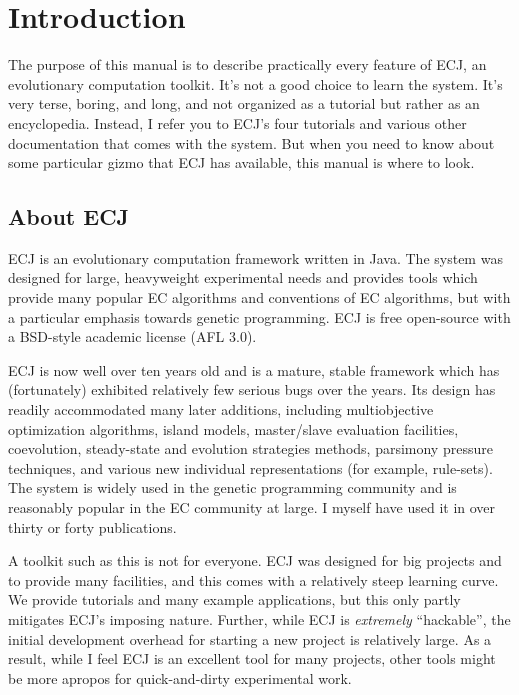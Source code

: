 \documentclass[twoside,10pt]{book}
\begin{document}
\normalsize
\cleardoublepage

\tableofcontents
\clearpage


\chapter{Introduction}

The purpose of this manual is to describe practically every feature of ECJ, an evolutionary computation toolkit.  It's not a good choice to learn the system.  It's very terse, boring, and long, and not organized as a tutorial but rather as an encyclopedia.  Instead, I refer you to ECJ's four tutorials and various other documentation that comes with the system.  But when you need to know about some particular gizmo that ECJ has available, this manual is where to look.

\section{About ECJ}

ECJ is an evolutionary computation framework written in Java.  The system was designed for large, heavyweight experimental needs and provides tools which provide many popular EC algorithms and conventions of EC algorithms, but with a particular emphasis towards genetic programming. ECJ is free open-source with a BSD-style academic license (AFL 3.0).

ECJ is now well over ten years old and is a mature, stable framework which has (fortunately) exhibited relatively few serious bugs over the years.  Its design has readily accommodated many later additions, including multiobjective optimization algorithms, island models, master/slave evaluation facilities, coevolution, steady-state and evolution strategies methods, parsimony pressure techniques, and various new individual representations (for example, rule-sets). The system is widely used in the genetic programming community and is reasonably popular in the EC community at large. I myself have used it in over thirty or forty publications.

A toolkit such as this is not for everyone.  ECJ was designed for big projects and to provide many facilities, and this comes with a relatively steep learning curve.  We provide tutorials and many example applications, but this only partly mitigates ECJ's imposing nature.  Further, while ECJ is {\it extremely} ``hackable'', the initial development overhead for starting a new project is relatively large.  As a result, while I feel ECJ is an excellent tool for many projects, other tools might be more apropos for quick-and-dirty experimental work.
\end{document}
